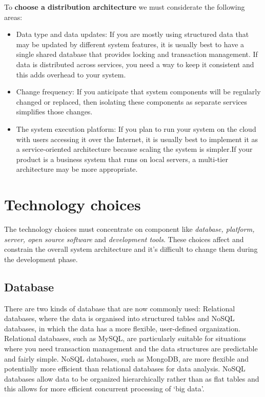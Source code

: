\documentclass[10pt,a4paper]{report}
\begin{document}
To \textbf{choose a distribution architecture} we must considerate the following areas:
\begin{itemize}
	\item Data type and data updates: If you are mostly using structured data that may be updated by different system features,
	it is usually best to have a single shared database that provides locking and transaction
	management. If data is distributed across services, you need a way to keep it consistent
	and this adds overhead to your system.
	
	\item Change frequency: If you anticipate that system components will be regularly changed or replaced, then
	isolating these components as separate services simplifies those changes.
	
	\item The system execution platform: If you plan to run your system on the cloud with users accessing it over the Internet, it is usually best to implement it as a service-oriented architecture because scaling the system is simpler.If your product is a business system that runs on local servers, a multi-tier architecture may be more appropriate.
\end{itemize}

\section{Technology choices}
The technology choices must concentrate on component like \textit{database, platform, server, open source software} and \textit{development tools}. These choices affect and constrain the overall system architecture and it's difficult to change them during the development phase.

\subsection{Database}
There are two kinds of database that are now commonly used: Relational databases, where the data is organised into structured tables and NoSQL databases, in which the data has a more flexible, user-defined
organization.
Relational databases, such as MySQL, are particularly suitable for situations where you need transaction management and the data structures are predictable and fairly simple.
NoSQL databases, such as MongoDB, are more flexible and potentially more efficient than relational databases for data analysis. NoSQL databases allow data to be organized hierarchically rather than as flat
tables and this allows for more efficient concurrent processing of ‘big data’.
\end{document}

